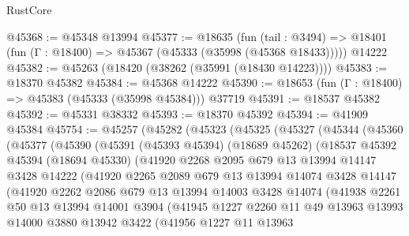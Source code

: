 \begin{lexlean}{RustCore}
\begin{coremodule}
@45368 := @45348 @13994
@45377 := @18635
    (fun (tail : @3494) => @18401 (fun (Γ : @18400) => @45367 (@45333 (@35998 (@45368 @18433)))))
    @14222
@45382 := @45263 (@18420 (@38262 (@35991 (@18430 @14223))))
@45383 := @18370 @45382
@45384 := @45368 @14222
@45390 := @18653 (fun (Γ : @18400) => @45383 (@45333 (@35998 @45384))) @37719
@45391 := @18537 @45382
@45392 := @45331 @38332
@45393 := @18370 @45392
@45394 := @41909 @45384
@45754 := @45257
    (@45282
      (@45323
        (@45325
          (@45327
            (@45344
              (@45360
                (@45377
                  (@45390
                    (@45391
                      (@45393 @45394)
                      (@18689 @45262)
                      (@18537
                        @45392
                        @45394
                        (@18694 @45330)
                        (@41920
                          @2268
                          @2095
                          @679
                          @13
                          @13994
                          @14147
                          @3428
                          @14222
                          (@41920
                            @2265
                            @2089
                            @679
                            @13
                            @13994
                            @14074
                            @3428
                            @14147
                            (@41920
                              @2262
                              @2086
                              @679
                              @13
                              @13994
                              @14003
                              @3428
                              @14074
                              (@41938
                                @2261
                                @50
                                @13
                                @13994
                                @14001
                                @3904
                                (@41945
                                  @1227
                                  @2260
                                  @11
                                  @49
                                  @13963
                                  @13993
                                  @14000
                                  @3880
                                  @13942
                                  @3422
                                  (@41956
                                    @1227
                                    @11
                                    @13963

\end{coremodule}
\end{lexlean}
